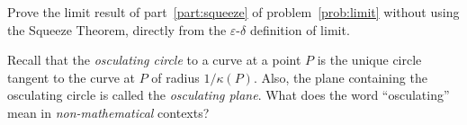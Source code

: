 \documentclass[12pt]{exam}
\begin{document}
\begin{questions}

\newpage

\bonusquestion[8] Prove the limit result of part~\ref{part:squeeze} of problem~\ref{prob:limit} without using the Squeeze Theorem, directly from the $\varepsilon$-$\delta$ definition of limit.


\bonusquestion[3] Recall that the \emph{osculating circle} to a curve at a point $P$ is the unique circle tangent to the curve at $P$ of radius $1/\kappa(P)$. Also, the plane containing the osculating circle is called the \emph{osculating plane}. What does the word ``osculating'' mean in \emph{non-mathematical} contexts?


\end{questions}
\end{document}
